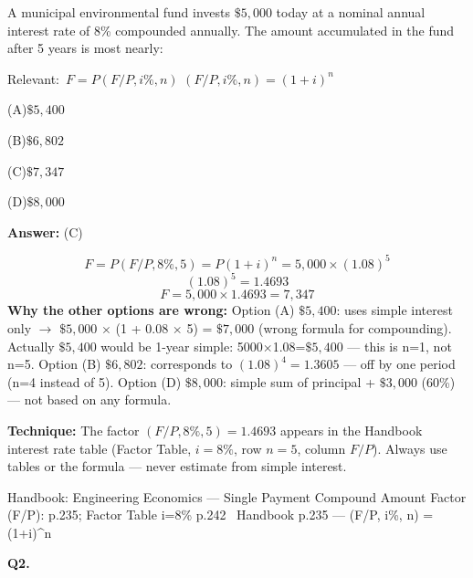 \documentclass[11pt]{article}
\newcommand{\correct}[1]{\textbf{#1}\;{\color{accent}$\checkmark$}}
\newcommand{\optline}[2]{\par\noindent\hspace{1.2em}(#1)\hspace{0.6em}#2}
\begin{document}
A municipal environmental fund invests $\$5{,}000$ today at a nominal annual interest rate of 8\% compounded annually. The amount accumulated in the fund after 5 years is most nearly:\par\par\vspace{3pt}
{\small\color{soft}Relevant:}\ $F = P(F/P, i\%, n)$ \quad $(F/P, i\%, n) = (1 + i)^n$\par\vspace{3pt}
\optline{A}{$\$5{,}400$}
\optline{B}{$\$6{,}802$}
\optline{C}{\correct{$\$7{,}347$}}
\optline{D}{$\$8{,}000$}
\par\vspace{3pt}
\vspace{2pt}\par\noindent\colorbox{boxbg}{\parbox{\dimexpr\linewidth-2\fboxsep\relax}{%
\vspace{2pt}\textbf{Answer:} (C)\par\vspace{2pt}
{\small \[F = P(F/P, 8\%, 5) = P(1 + i)^n = 5{,}000 \times (1.08)^5\]
\[(1.08)^5 = 1.4693\]
\[F = 5{,}000 \times 1.4693 = 7{,}347\]
\textbf{Why the other options are wrong:} Option (A) $\$5{,}400$: uses simple interest only $\rightarrow$ $\$5{,}000$ $\times$ (1 + 0.08 $\times$ 5) = $\$7{,}000$ (wrong formula for compounding). Actually $\$5{,}400$ would be 1-year simple: 5000$\times$1.08=$\$5{,}400$ --- this is n=1, not n=5. Option (B) $\$6{,}802$: corresponds to $(1.08)^4 = 1.3605$ --- off by one period (n=4 instead of 5). Option (D) $\$8{,}000$: simple sum of principal + $\$3{,}000$ (60\%) --- not based on any formula.\par
\textbf{Technique:} The factor $(F/P, 8\%, 5) = 1.4693$ appears in the Handbook interest rate table (Factor Table, $i = 8\%$, row $n = 5$, column $F/P$). Always use tables or the formula --- never estimate from simple interest.\par}\par\vspace{2pt}
{\footnotesize\color{soft}Handbook: Engineering Economics --- Single Payment Compound Amount Factor (F/P): p.235; Factor Table i=8\% p.242 \textbullet\ Handbook p.235 --- (F/P, i\%, n) = (1+i)\textasciicircum{}n}\vspace{2pt}
}}
\vspace{9pt}
\filbreak
\textbf{\color{accent}Q2.}\par\vspace{2pt}
\end{document}
